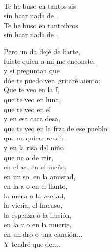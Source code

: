 \begin{cancion}%
	    \\
	Te he buso en tantos sis \\
	sin haar nada de . \\
	Te he buso en tantoibros\\
	sin haar nada de . \jump\\
	\begin{chorus}%
		Pero un da dejé de barte, \\
		fuiste  quien a mi me enconste, \\
		y si  preguntan que \\
		dóe te puedo ver, gritaré aiento:\\
	\jump
		Que te veo en la f, \\
		que te veo en luna,\\
		que te veo en el  \\
		y en esa cara desa,\\
		que te veo en la frza de ese pueblo\\
		que no  quiere rendir\\
		y en la risa del niño \\
		que no a de reir,\\
		en el aa, en el sueño, \\
		en un so, en la amistad,\\
		en la a o en el llanto, \\
		la mena o la verdad,\\
		la vicria, el fracaso, \\
		la espenza o la ilusión,\\
		en la v o en la muerte, \\
		en un dro o una canción...\\
		Y tendré que der...\\

\end{chorus}
\end{cancion}
